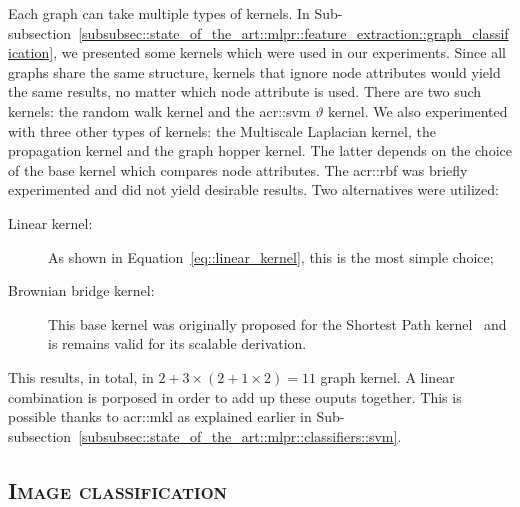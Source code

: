         Each graph can take multiple types of kernels.
        In Sub-subsection~\ref{subsubsec::state_of_the_art::mlpr::feature_extraction::graph_classification}, we presented some kernels which were used in our experiments.
        Since all graphs share the same structure, kernels that ignore node attributes would yield the same results, no matter which node attribute is used.
        There are two such kernels: the random walk kernel and the \gls{acr::svm} \(\vartheta\) kernel.
        We also experimented with three other types of kernels: the Multiscale Laplacian kernel, the propagation kernel and the graph hopper kernel.
        The latter depends on the choice of the base kernel which compares node attributes.
        The \gls{acr::rbf} was briefly experimented and did not yield desirable results.
        Two alternatives were utilized:
        \begin{description}
            \item[Linear kernel:] As shown in Equation~\ref{eq::linear_kernel}, this is the most simple choice;
            \item[Brownian bridge kernel:] This base kernel was originally proposed for the Shortest Path kernel~\parencite{borgwardt2005shortest} and is remains valid for its scalable derivation.
        \end{description}
        This results, in total, in \(2 + 3 \times \left(2 + 1 \times 2\right) = 11\) graph kernel.
        A linear combination is porposed in order to add up these ouputs together.
        This is possible thanks to \gls{acr::mkl} as explained earlier in Sub-subsection~\ref{subsubsec::state_of_the_art::mlpr::classifiers::svm}.
        
    \subsection{\textsc{Image classification}}
        \label{subsec::learned_evaluation::richer_features::image}
